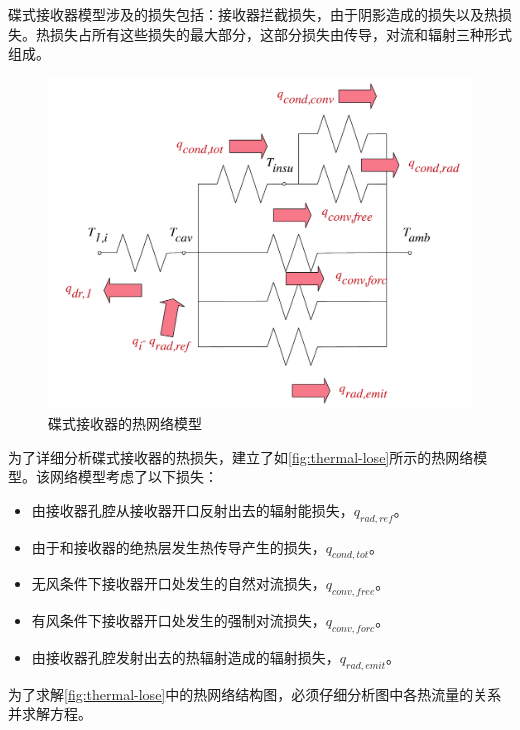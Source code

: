 碟式接收器模型涉及的损失包括：接收器拦截损失，由于阴影造成的损失以及热损失。热损失占所有这些损失的最大部分，这部分损失由传导，对流和辐射三种形式组成。
\begin{figure}[ht!]
	\centering
	\includegraphics[width = 0.5\columnwidth]{fig/thermalLosses.pdf}
	\caption{碟式接收器的热网络模型}
	\label{fig:thermal-lose}
\end{figure}
为了详细分析碟式接收器的热损失，建立了如\autoref{fig:thermal-lose}所示的热网络模型。该网络模型考虑了以下损失：
\begin{itemize}
	\item 由接收器孔腔从接收器开口反射出去的辐射能损失，$q_{rad,ref}$。
	\item 由于和接收器的绝热层发生热传导产生的损失，$q_{cond,tot}$。
	\item 无风条件下接收器开口处发生的自然对流损失，$q_{conv,free}$。
	\item 有风条件下接收器开口处发生的强制对流损失，$q_{conv,forc}$。
	\item 由接收器孔腔发射出去的热辐射造成的辐射损失，$q_{rad,emit}$。
\end{itemize}

为了求解\autoref{fig:thermal-lose}中的热网络结构图，必须仔细分析图中各热流量的关系并求解方程。

